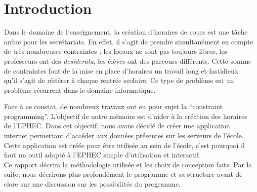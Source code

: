 

\chapter*{Introduction}

Dans le domaine de l'enseignement, la création d'horaires de cours est une tâche ardue pour les secrétariats. En effet, il s'agit de prendre simultanément en compte de très nombreuses contraintes ; les locaux ne sont pas toujours libres, les professeurs ont des \textit{desiderata}, les élèves ont des parcours différents. Cette somme de contraintes font de la mise en place d'horaires un travail long et fastidieux qu'il s'agit de réitérer à chaque rentrée scolaire. 
\newline
\indent
Ce type de problème est un problème récurrent dans le domaine informatique.

Face à ce constat, de nombreux travaux ont eu pour sujet la \enquote{constraint programming}. 
\newline
\indent
L'objectif de notre mémoire est d'aider à la création des horaires de l'EPHEC.
Dans cet objectif, nous avons décidé de créer une application internet permettant d'accéder
aux données présentes sur les serveurs de l'école.\\
\newline
\indent
Cette application est créée pour être utilisée au sein de l'école, c'est pourquoi il faut un 
outil adapté à l'EPHEC simple d'utilisation et interactif. \\
\newline
\indent
Ce rapport décrira la méthodologie utilisée et les choix de conception faits.
Par la suite, nous décrirons plus profondément le programme et sa structure avant de clore sur une discussion sur les possibilités du programme. 



